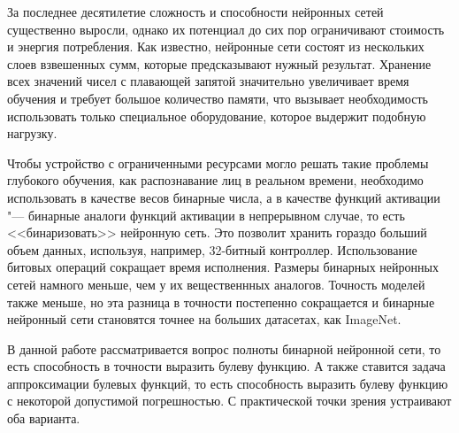     За последнее десятилетие сложность и способности нейронных сетей существенно выросли, однако их потенциал до сих пор ограничивают стоимость и энергия потребления. Как известно, нейронные сети состоят из нескольких слоев взвешенных сумм, которые предсказывают нужный результат. Хранение всех значений чисел с плавающей запятой значительно увеличивает время обучения и требует большое количество памяти, что вызывает необходимость использовать только специальное оборудование, которое выдержит подобную нагрузку.
    
    Чтобы устройство с ограниченными ресурсами могло решать такие проблемы глубокого обучения, как распознавание лиц в реальном времени, необходимо использовать в качестве весов бинарные числа, а в качестве функций активации "--- бинарные аналоги функций активации в непрерывном случае, то есть <<бинаризовать>> нейронную сеть. Это позволит хранить гораздо больший объем данных, используя, например, 32-битный контроллер. Использование битовых операций сокращает время исполнения. Размеры бинарных нейронных сетей намного меньше, чем у их вещественнных аналогов. Точность моделей также меньше, но эта разница в точности постепенно сокращается и бинарные нейронный сети становятся точнее на больших датасетах, как ImageNet.
    
    В данной работе рассматривается вопрос полноты бинарной нейронной сети, то есть способность в точности выразить булеву функцию. А также ставится задача аппроксимации булевых функций, то есть способность выразить булеву функцию с некоторой допустимой погрешностью. С практической точки зрения устраивают оба варианта.
